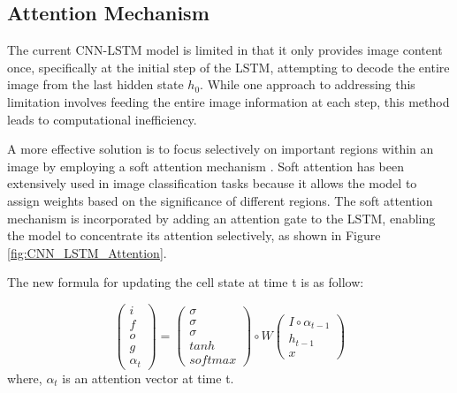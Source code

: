 \documentclass[conference]{IEEEtran}
\begin{document}
\subsection{Attention Mechanism\label{subsec:attention}}




The current CNN-LSTM model is limited in that it only provides image content once, specifically at the initial step of the LSTM, attempting to decode the entire image from the last hidden state $h_0$. While one approach to addressing this limitation involves feeding the entire image information %
at each step, this method leads to computational inefficiency.


A more effective solution is to focus selectively on important regions within an image by employing a soft attention mechanism \cite{mcclenny2020self}. Soft attention has been extensively used in image classification tasks \cite{wang2017residual} %
because it allows the model to assign weights based on the significance of different regions. The soft attention mechanism is incorporated by adding an attention gate to the LSTM, enabling the model to concentrate its attention selectively, as shown in Figure \ref{fig:CNN_LSTM_Attention}.


The new formula for updating the cell state at time t is as follow:

$$
\begin{pmatrix}
i \\f \\o \\g \\\alpha_t
\end{pmatrix}
= 
\begin{pmatrix}
\sigma \\ \sigma \\ \sigma \\ tanh \\ softmax
\end{pmatrix}
\circ
W
\begin{pmatrix}
I \circ \alpha_{t-1} \\ h_{t-1} \\ x
\end{pmatrix}
$$
where, $\alpha_t$ is an attention vector at time t.
\end{document}
